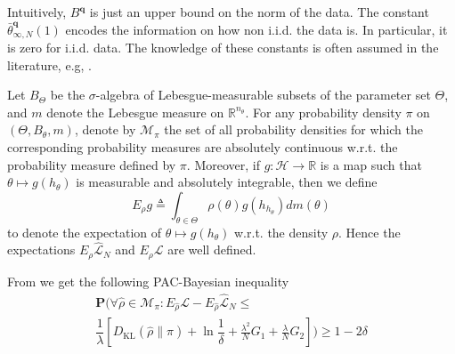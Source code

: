 \documentclass{ifacconf}
\def\rvq{{\mathbf{q}}}
\newcommand{\KL}{D_{\mathrm{KL}}}
\newcommand{\bP}{\mathbf{P}}
\begin{document}
Intuitively, $B^\rvq$ is just an upper bound on the norm of the data. The constant 
$\bar{\theta}_{\infty,N}^{\rvq}(1)$ encodes the information on how non i.i.d. the data is.
In particular, it is zero for i.i.d. data.
The knowledge of these constants is often assumed in  the literature, e.g, \cite{alquier2013prediction, alquier2021userfriendly}. %
\begin{pf}
Let $B_{\Theta}$ be the $\sigma$-algebra of Lebesgue-measurable subsets of the parameter set $\Theta$, and $m$ denote the Lebesgue measure on $\mathbb{R}^{n_\theta}$. For any probability density $\pi$ on $(\Theta,B_{\theta},m)$, denote by $\mathcal{M}_\pi$ the set of all probability densities for which the corresponding probability measures are absolutely continuous w.r.t. the probability measure defined by $\pi$. Moreover, if $g:\mathcal{H} \rightarrow \mathbb{R}$ is a map such that $\theta \mapsto g(h_{\theta})$ is measurable and absolutely integrable, then we define
\begin{equation*}
	E_{\rho} g\triangleq\int_{\theta \in \Theta} \rho(\theta)g(h_{h_\theta})dm(\theta)  %
\end{equation*}
to denote the expectation of $\theta \mapsto g(h_{\theta})$ w.r.t. the density $\rho$. Hence the expectations $E_{\rho} \hat{\mathcal{L}}_N$ and  $E_{\rho} \mathcal{L}$ are well defined.

  
  From \cite{eringis2023pacbayesRNN_OLD} we get the following 
  PAC-Bayesian inequality
  \begin{multline} \label{eq:pac:gen1}
        \bP(\forall\hat{\rho}\in\mathcal{M}_\pi: E_{\hat{\rho}} \mathcal{L} - E_{\hat{\rho}} \hat{\mathcal{L}}_N \le \\
           \dfrac{1}{\lambda}\!\left[ \KL(\hat{\rho} \|\pi) +
	\ln\dfrac{1}{\delta}+ %
  \frac{\lambda^2}{N}  G_1 +\frac{\lambda}{N}G_2  \right]) \ge 1-2\delta
    \end{multline}
  


\end{pf}
\end{document}
